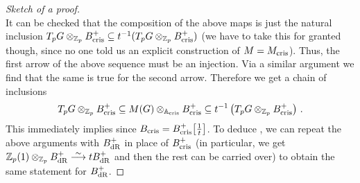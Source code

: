 \documentclass[a4paper, 10pt, oneside, DIV=9, chapterprefix=true, numbers=enddot,bibliography=totoc]{scrbook}
\begin{document}
\begin{proof}[Sketch of a proof]
\begin{equation*}
	 \end{equation*}
	 It can be checked that the composition of the above maps is just the natural inclusion $T_pG\otimes_{\mathbb{Z}_p}B_{\mathrm{cris}}^+\subseteq t^{-1}(T_pG\otimes_{\mathbb{Z}_p}B_{\mathrm{cris}}^+)$ (we have to take this for granted though, since no one told us an explicit construction of $M=M_{\mathrm{cris}}$). Thus, the first arrow of the above sequence must be an injection. Via a similar argument we find that the same is true for the second arrow. Therefore we get a chain of inclusions
	 \begin{equation*}
	 T_pG\otimes_{\mathbb{Z}_p}B_{\mathrm{cris}}^+\subseteq M(G)\otimes_{\mathbb{A}_{\mathrm{cris}}}B_{\mathrm{cris}}^+\subseteq t^{-1}\left(T_pG\otimes_{\mathbb{Z}_p}B_{\mathrm{cris}}^+\right)\,.
	 \end{equation*}
	 This immediately implies  since $B_{\mathrm{cris}}=B_{\mathrm{cris}}^+\big[\textstyle\frac{1}{t}\big]$. To deduce , we can repeat the above arguments with $B_{\mathrm{dR}}^+$ in place of $B_{\mathrm{cris}}^+$ (in particular, we get $\IZ_p(1)\otimes_{\IZ_p}B_\dR^+\isomorphism tB_\dR^+$ and then the rest can be carried over) to obtain the same statement for $B_{\mathrm{dR}}^+$.
\end{proof}
\end{document}
